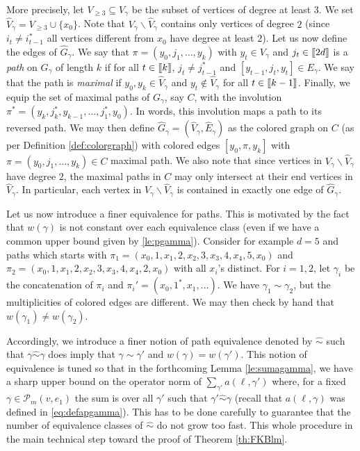 \documentclass[11pt]{article}
\newcommand{\cP}{\mathcal {P}}
\newcommand{\1}{1\!\!{\sf I}}
\newcommand{\INT}[1]{{{\left[\hspace{-1.4pt}\left[#1\right]\hspace{-1.4pt}\right]}}}
\begin{document}
More precisely, let $V_{\geq 3} \subseteq V_\gamma$ be the subset of vertices of degree at least $3$. We set $\widehat V_\gamma = V_{\geq 3} \cup \{x_0 \}$. Note that $V_\gamma \backslash \widehat V_\gamma$ contains only vertices of degree $2$ (since $i_{t} \ne i_{t-1}^*$ all vertices different from $x_0$ have degree at least $2$). Let us now define the edges of $\widehat G_\gamma$. We say that $\pi = (y_0,j_1,\ldots,y_k)$ with $y_t \in V_\gamma$ and $j_t \in \INT{2d}$ is a {\em path} on $G_\gamma$ of length $k$ if for all $t \in \INT{k}$, $j_{t} \ne j_{t-1}^*$ and $[y_{t-1}, j_t, y_{t}] \in E_\gamma$. We say that the path is {\em maximal} if $y_0 , y_k \in \widehat V_\gamma$ and $y_t \notin \widehat V_\gamma$ for all $t \in \INT{k-1}$.  Finally, we equip the set of maximal paths of $G_\gamma$, say $C$, with the involution $\pi^* = (y_k,j_{k}^*,y_{k-1},\ldots, j_{1}^*,y_0)$. In words, this involution maps a path to its reversed path. We may then define $\widehat G_\gamma = (\widehat V_\gamma, \widehat E_\gamma)$ as the colored graph on $C$ (as per Definition \ref{def:colorgraph}) with colored edges $[y_0, \pi, y_k ]$ with $\pi = (y_0,j_1,\ldots,y_k) \in C$ maximal path. We also note that since vertices in $V_\gamma \backslash \widehat V_\gamma$ have degree $2$, the maximal paths in $C$ may only intersect at their end vertices in $\widehat V_\gamma$. In particular, each vertex in $V_\gamma \backslash \widehat V_\gamma$ is contained in exactly one edge of $\widehat G_\gamma$.
 
Let us now introduce a finer equivalence for paths. This is motivated by the fact that $w(\gamma)$ is not constant over each equivalence class (even if we have a common upper bound given by \eqref{le:pgamma}). Consider for example $d = 5$ and paths which starts with $\pi_1 = (x_0,1,x_1,2,x_2,3,x_3,4,x_4,5,x_0)$ and $\pi_2 = (x_0,1,x_1,2,x_2,3,x_3,4,x_4,2,x_0)$ with all $x_i$'s distinct. For $i = 1,2$, let $\gamma_i$ be the concatenation of $\pi_i$ and  $\pi_i' = (x_0,1^*,x_1,\ldots)$. We have $\gamma_1 \sim \gamma_2$, but the multiplicities of colored edges are different. We may then check by hand that $w(\gamma_1) \ne w(\gamma_2)$. 

Accordingly, we introduce a finer notion of path equivalence denoted by $\hat \sim$ such that $\gamma \hat \sim  \gamma$  does imply that $\gamma \sim \gamma'$ and $w(\gamma) = w(\gamma')$. This notion of equivalence is tuned so that in the forthcoming Lemma \ref{le:sumagamma}, we have a sharp upper bound on the operator norm of $\sum_{\gamma'} a(\ell,\gamma')$ where, for a fixed $\gamma \in \cP_{m}(v,e_1)$ the sum is over all $\gamma'$ such that $\gamma' \hat \sim \gamma$ 
(recall that $a(\ell,\gamma)$ was defined in \eqref{eq:defapgamma}). This has to be done carefully to guarantee that the number of equivalence classes of $\hat \sim$ do not grow too fast. This whole procedure in the main technical step toward the proof of Theorem \ref{th:FKBlm}.
\end{document}
